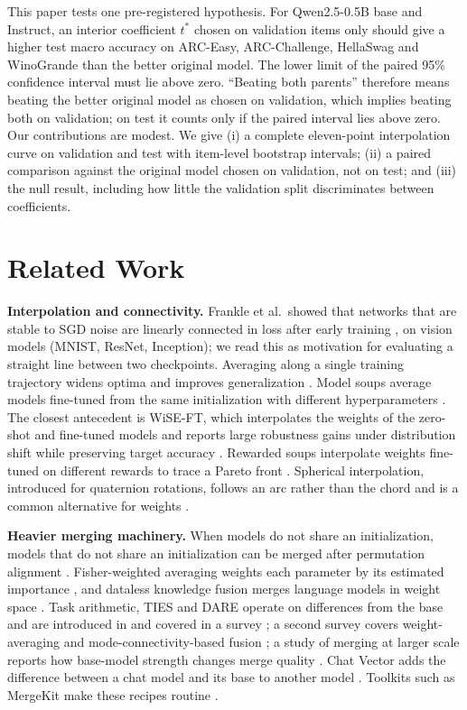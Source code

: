 \documentclass[conference]{IEEEtran}
\begin{document}
This paper tests one pre-registered hypothesis. For Qwen2.5-0.5B base and Instruct, an interior coefficient $t^\ast$ chosen on validation items only should give a higher test macro accuracy on ARC-Easy, ARC-Challenge, HellaSwag and WinoGrande than the better original model. The lower limit of the paired 95\% confidence interval must lie above zero. ``Beating both parents'' therefore means beating the better original model as chosen on validation, which implies beating both on validation; on test it counts only if the paired interval lies above zero. Our contributions are modest. We give (i) a complete eleven-point interpolation curve on validation and test with item-level bootstrap intervals; (ii) a paired comparison against the original model chosen on validation, not on test; and (iii) the null result, including how little the validation split discriminates between coefficients.

\section{Related Work}
\textbf{Interpolation and connectivity.} Frankle et al.\ showed that networks that are stable to SGD noise are linearly connected in loss after early training \cite{frankle2020lmc}, on vision models (MNIST, ResNet, Inception); we read this as motivation for evaluating a straight line between two checkpoints. Averaging along a single training trajectory widens optima and improves generalization \cite{izmailov2018swa}. Model soups average models fine-tuned from the same initialization with different hyperparameters \cite{wortsman2022soups}. The closest antecedent is WiSE-FT, which interpolates the weights of the zero-shot and fine-tuned models and reports large robustness gains under distribution shift while preserving target accuracy \cite{wortsman2022wise}. Rewarded soups interpolate weights fine-tuned on different rewards to trace a Pareto front \cite{rame2023rewarded}. Spherical interpolation, introduced for quaternion rotations, follows an arc rather than the chord and is a common alternative for weights \cite{shoemake1985slerp}.

\textbf{Heavier merging machinery.} When models do not share an initialization, models that do not share an initialization can be merged after permutation alignment \cite{ainsworth2023rebasin}. Fisher-weighted averaging weights each parameter by its estimated importance \cite{matena2022fisher}, and dataless knowledge fusion merges language models in weight space \cite{jin2023dataless}. Task arithmetic, TIES and DARE operate on differences from the base and are introduced in \cite{ilharco2023taskarith,yadav2023ties,yu2024dare} and covered in a survey \cite{yang2024survey}; a second survey covers weight-averaging and mode-connectivity-based fusion \cite{li2023fusion}; a study of merging at larger scale reports how base-model strength changes merge quality \cite{yadav2024scale}. Chat Vector adds the difference between a chat model and its base to another model \cite{huang2023chatvector}. Toolkits such as MergeKit make these recipes routine \cite{goddard2024mergekit}.
\end{document}
